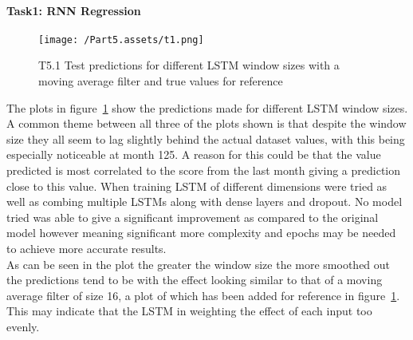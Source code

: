 \documentclass[10pt,twocolumn,letterpaper]{article}
\begin{document}
\paragraph{Task1: RNN Regression}
\begin{figure}[ht]
    \begin{center}
        \texttt{[image: /Part5.assets/t1.png]}
        \caption{T5.1 Test predictions for different LSTM window sizes with a moving average filter and true values for reference}\label{fig:t51}
        \vspace{-0.7cm}
    \end{center}
\end{figure}
The plots in figure~\ref{fig:t51} show the predictions made for different LSTM window sizes. A common theme between all three of the plots shown is that despite the window size they all seem to lag slightly behind the actual dataset values, with this being especially noticeable at month 125. A reason for this could be that the value predicted is most correlated to the score from the last month giving a prediction close to this value. When training LSTM of different dimensions were tried as well as combing multiple LSTMs along with dense layers and dropout. No model tried was able to give a significant improvement as compared to the original model however meaning significant more complexity and epochs may be needed to achieve more accurate results.\\
As can be seen in the plot the greater the window size the more smoothed out the predictions tend to be with the effect looking similar to that of a moving average filter of size 16, a plot of which has been added for reference in figure~\ref{fig:t51}. This may indicate that the LSTM in weighting the effect of each input too evenly. 
\end{document}
